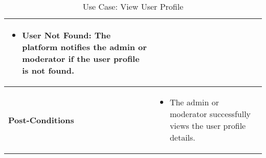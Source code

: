 \begin{table}[!ht]
\begin{tabularx}{\textwidth}{|l|X|}
\begin{itemize}[label=--,itemsep=0pt]
            \item User Not Found: The platform notifies the admin or moderator if the user profile is not found.
        \end{itemize} \\
        \hline
        \textbf{Post-Conditions} & 
        \begin{itemize}[label=--,itemsep=0pt]
            \item The admin or moderator successfully views the user profile details.
        \end{itemize} \\
        \hline
    \end{tabularx}
    \caption{Use Case: View User Profile}
    \label{tab:use-case-view-user-profile}
\end{table}


